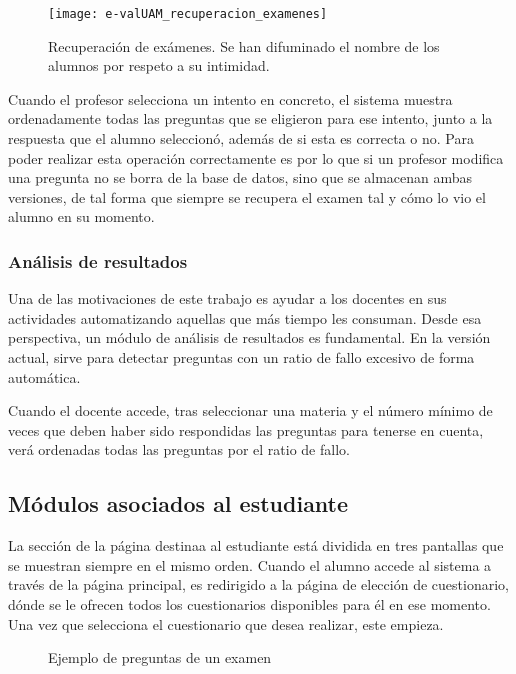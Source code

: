 \begin{figure}[htp!]
	\centering
	\texttt{[image: e-valUAM\_recuperacion\_examenes]}
	\caption[Recuperación de exámenes]{Recuperación de exámenes. Se han difuminado el nombre de los alumnos por respeto a su intimidad.}
	\label{fig:e-valUAM recuperacion examenes profesor}
\end{figure}

Cuando el profesor selecciona un intento en concreto, el sistema muestra ordenadamente todas las preguntas que se eligieron para ese intento, junto a la respuesta que el alumno seleccionó, además de si esta es correcta o no. Para poder realizar esta operación correctamente es por lo que si un profesor modifica una pregunta no se borra de la base de datos, sino que se almacenan ambas versiones, de tal forma que siempre se recupera el examen tal y cómo lo vio el alumno en su momento.

\subsubsection{Análisis de resultados}

Una de las motivaciones de este trabajo es ayudar a los docentes en sus actividades automatizando aquellas que más tiempo les consuman. Desde esa perspectiva, un módulo de análisis de resultados es fundamental. En la versión actual, sirve para detectar preguntas con un ratio de fallo excesivo de forma automática. 

Cuando el docente accede, tras seleccionar una materia y el número mínimo de veces que deben haber sido respondidas las preguntas para tenerse en cuenta, verá ordenadas todas las preguntas por el ratio de fallo.

\subsection{Módulos asociados al estudiante}

La sección de la página destinaa al estudiante está dividida en tres pantallas que se muestran siempre en el mismo orden. Cuando el alumno accede al sistema a través de la página principal, es redirigido a la página de elección de cuestionario, dónde se le ofrecen todos los cuestionarios disponibles para él en ese momento. Una vez que selecciona el cuestionario que desea realizar, este empieza.

\begin{figure}[!htp]

	\caption{Ejemplo de preguntas de un examen}
	\label{fig:e-valUAM examenes}
\end{figure}

